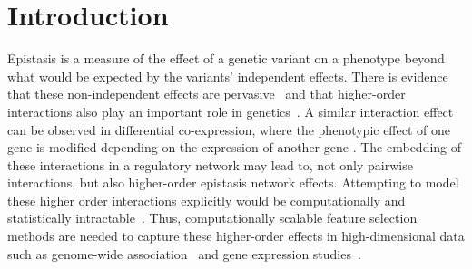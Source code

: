 \documentclass[10pt]{article}
\begin{document}
\begin{abstract}
\\

\end{abstract}


\section{Introduction}

Epistasis is a measure of the effect of a genetic variant on a phenotype beyond what would be expected by the variants' independent effects. There is evidence that these non-independent effects are pervasive~\cite{breen12} and that higher-order interactions also play an important role in genetics~\cite{weinreich13}. 
A similar interaction effect can be observed in differential co-expression, where the phenotypic effect of one gene is modified depending on the expression of another gene \cite{lareau15,diffcoexp10}.
The embedding of these interactions in a regulatory network may lead to, not only pairwise interactions, but also higher-order epistasis network effects. Attempting to model these higher order interactions explicitly would be computationally and statistically intractable~\cite{riesselman18}.
Thus, computationally scalable feature selection methods are needed to capture these higher-order effects in high-dimensional data such as genome-wide association~\cite{titv} and gene expression studies~\cite{stir}.
\end{document}
